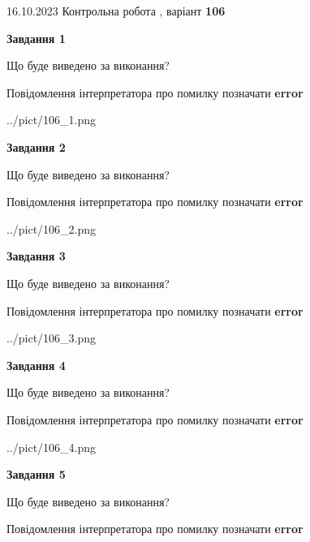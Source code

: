 \documentclass[12pt, ukrainian]{article}
\begin{document}
{\Large{16.10.2023 Контрольна робота , варіант  \No \textbf { 106 }\par}}
{
\begin {large}
{\begin {center}\textbf{Завдання 1}\end {center}}\par
Що буде виведено за виконання? \par
Повідомлення інтерпретатора про помилку позначати \textbf{error}

\begin{center}
	{../pict/106_1.png}
\end{center}
\newpage

{\begin {center}\textbf{Завдання 2}\end {center}}\par
Що буде виведено за виконання? \par
Повідомлення інтерпретатора про помилку позначати \textbf{error}

\begin{center}
	{../pict/106_2.png}
\end{center}
\newpage

{\begin {center}\textbf{Завдання 3}\end {center}}\par
Що буде виведено за виконання? \par
Повідомлення інтерпретатора про помилку позначати \textbf{error}

\begin{center}
	{../pict/106_3.png}
\end{center}
\newpage

{\begin {center}\textbf{Завдання 4}\end {center}}\par
Що буде виведено за виконання? \par
Повідомлення інтерпретатора про помилку позначати \textbf{error}

\begin{center}
	{../pict/106_4.png}
\end{center}
\newpage

{\begin {center}\textbf{Завдання 5}\end {center}}\par
Що буде виведено за виконання? \par
Повідомлення інтерпретатора про помилку позначати \textbf{error}


\end{large}}
\end{document}
